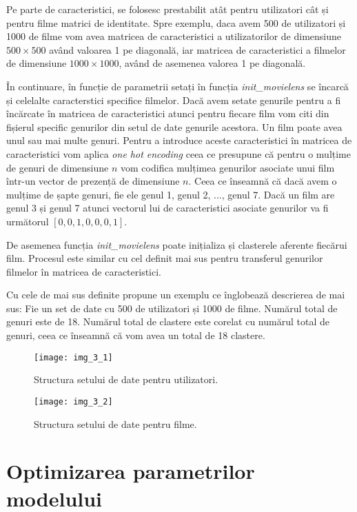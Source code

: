 Pe parte de caracteristici, se folosesc prestabilit atât pentru utilizatori cât și pentru filme matrici de identitate. Spre exemplu, daca avem 500 de utilizatori și 1000 de filme vom avea matricea de caracteristici a utilizatorilor de dimensiune $500 \times 500$ având valoarea 1 pe diagonală, iar matricea de caracteristici a filmelor de dimensiune $1000 \times 1000$, având de asemenea valorea 1 pe diagonală.

În continuare, în funcție de parametrii setați în funcția \textit{init\_movielens} se încarcă și celelalte caracterstici specifice filmelor. Dacă avem setate genurile pentru a fi încărcate în matricea de caracteristici atunci pentru fiecare film vom citi din fișierul specific genurilor din setul de date genurile acestora. Un film poate avea unul sau mai multe genuri. Pentru a introduce aceste caracteristici în matricea de caracteristici vom aplica \textit{one hot encoding} ceea ce presupune că pentru o mulțime de genuri de dimensiune $n$ vom codifica mulțimea genurilor asociate unui film într-un vector de prezență de dimensiune $n$. Ceea ce înseamnă că dacă avem o mulțime de șapte genuri, fie ele genul 1, genul 2, ..., genul 7. Dacă un film are genul 3 și genul 7 atunci vectorul lui de caracteristici asociate genurilor va fi următorul $[0, 0, 1, 0, 0, 0, 1]$.

De asemenea funcția \textit{init\_movielens} poate inițializa și clasterele aferente fiecărui film. Procesul este similar cu cel definit mai sus pentru transferul genurilor filmelor în matricea de caracteristici.

Cu cele de mai sus definite propune un exemplu ce înglobează descrierea de mai sus:
Fie un set de date cu 500 de utilizatori și 1000 de filme. Numărul total de genuri este de 18. Numărul total de clastere este corelat cu numărul total de genuri, ceea ce înseamnă că vom avea un total de 18 clastere.
\begin{figure}[!h]
	\centering
	\texttt{[image: img\_3\_1]}
	\caption[Structura setului de date pentru utilizatori]{Structura setului de date pentru utilizatori.}
\end{figure} 

\begin{figure}[!h]
	\centering
	\texttt{[image: img\_3\_2]}
	\caption[Structura setului de date pentru filme]{Structura setului de date pentru filme.}
\end{figure} 

\section{Optimizarea parametrilor modelului}

